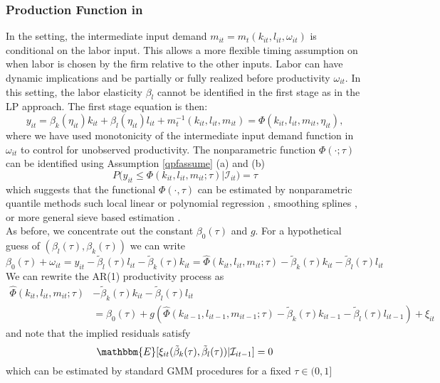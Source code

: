 \documentclass[11pt]{article}
\begin{document}
\subsubsection{Production Function in \cite{Ackerberg2015}}
In the \cite{Ackerberg2015} setting, the intermediate input demand $m_{it}=m_{t}(k_{it}, l_{it}, \omega_{it})$ is conditional on the labor input. This allows a more flexible timing assumption on when labor is chosen by the firm relative to the other inputs. Labor can have dynamic implications and be partially or fully realized before productivity $\omega_{it}$. In this setting, the labor elasticity $\beta_{l}$ cannot be identified in the first stage as in the LP approach. The first stage equation is then:
\begin{equation}\label{acf1}
y_{it}=\beta_{k}(\eta_{it})k_{it}+\beta_{l}(\eta_{it})l_{it}+m_{t}^{-1}(k_{it}, l_{it}, m_{it})=\Phi(k_{it}, l_{it}, m_{it}, \eta_{it}),
\end{equation}
where we have used monotonicity of the intermediate input demand function in $\omega_{it}$ to control for unobserved productivity. The nonparametric function $\Phi(\cdot;\tau)$ can be identified using Assumption \eqref{qpfassume} (a) and (b)
\begin{equation} \label{acfqpf1}
P\big(y_{it}\leq \Phi(k_{it}, l_{it}, m_{it}; \tau)\big|\mathcal{I}_{it})=\tau
\end{equation}
which suggests that the functional $\Phi(\cdot, \tau)$ can be estimated by nonparametric quantile methods such local linear or polynomial regression \citep{Chaudhuri1991,Chaudhuri1991a}, smoothing splines \citep{KOENKER1994}, or more general sieve based estimation \citep{2012a}.\\
As before, we concentrate out the constant $\beta_{0}(\tau)$ and $g$. For a hypothetical guess of $(\beta_{l}(\tau), \beta_{k}(\tau))$ we can write
\begin{equation}
\beta_{0}(\tau)+\omega_{it}=y_{it}-\tilde{\beta}_{l}(\tau)l_{it}-\tilde{\beta}_{k}(\tau)k_{it}=\hat{\Phi}(k_{it}, l_{it}, m_{it}; \tau)-\tilde{\beta}_{k}(\tau)k_{it}-\tilde{\beta}_{l}(\tau)l_{it}
\end{equation}
We can rewrite the AR(1) productivity process as
\begin{equation}
\begin{split}
\hat{\Phi}(k_{it}, l_{it}, m_{it}; \tau)&-\tilde{\beta}_{k}(\tau)k_{it}-\tilde{\beta}_{l}(\tau)l_{it}\\
&=\beta_{0}(\tau)+g(\hat{\Phi}(k_{it-1}, l_{it-1}, m_{it-1}; \tau)-\tilde{\beta}_{k}(\tau)k_{it-1}-\tilde{\beta}_{l}(\tau)l_{it-1})+\xi_{it}
\end{split}
\end{equation}
and note that the implied residuals satisfy
\begin{equation}
\mathbbm{E}[\xi_{it}(\tilde{\beta}_{k}(\tau), \tilde{\beta}_{l}(\tau))|\mathcal{I}_{it-1}]=0
\end{equation}
which can be estimated by standard GMM procedures for a fixed $\tau\in (0,1]$
\end{document}
